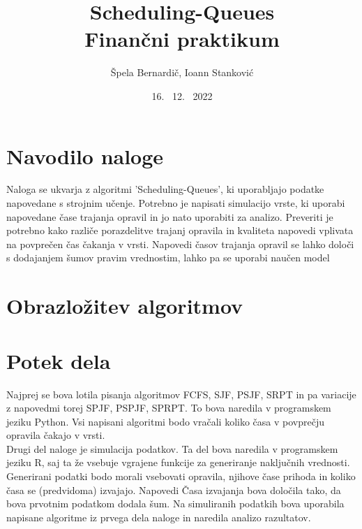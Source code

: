 \documentclass[a4paper, pt14]{article}
\begin{document}
\title{%
Scheduling-Queues\\
  \large Finančni praktikum}
\author{Špela Bernardič, Ioann Stanković}
\date{16. \ 12. \ 2022}

\maketitle

\section{Navodilo naloge}
Naloga se ukvarja z algoritmi 'Scheduling-Queues', ki uporabljajo podatke napovedane s strojnim učenje.
Potrebno je napisati simulacijo vrste, ki uporabi napovedane čase trajanja opravil in jo nato uporabiti za analizo.
Preveriti je potrebno kako različe porazdelitve trajanj opravila in kvaliteta napovedi vplivata na povprečen čas čakanja v vrsti.
Napovedi časov trajanja opravil se lahko določi s dodajanjem šumov pravim vrednostim, lahko pa se uporabi naučen model


\section{Obrazložitev algoritmov}

\section{Potek dela}

Najprej se bova lotila pisanja algoritmov FCFS, SJF, PSJF, SRPT  in pa variacije z napovedmi torej SPJF, PSPJF, SPRPT. To bova naredila v programskem jeziku Python.
Vsi napisani algoritmi bodo vračali koliko časa v povprečju opravila čakajo v vrsti.\\
Drugi del naloge je simulacija podatkov. Ta del bova naredila v programskem jeziku R, saj ta že vsebuje vgrajene funkcije za generiranje naključnih vrednosti.
Generirani podatki bodo morali vsebovati opravila, njihove čase prihoda in koliko časa se (predvidoma) izvajajo.
Napovedi Časa izvajanja bova določila tako, da bova prvotnim podatkom dodala šum.
Na simuliranih podatkih bova uporabila napisane algoritme iz prvega dela naloge in naredila analizo razultatov.
\end{document}
